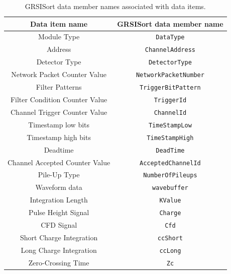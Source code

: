 \documentclass[letterpaper,12pt,notitlepage]{report}
\begin{document}
\newpage
\begin{table}
\begin{center}
\begin{tabular}{cc}
\hline
\hline
Data item name & GRSISort data member name\\
\hline
Module Type & \texttt{DataType} \\
Address & \texttt{ChannelAddress} \\
Detector Type & \texttt{DetectorType} \\
Network Packet Counter Value & \texttt{NetworkPacketNumber} \\
Filter Patterns & \texttt{TriggerBitPattern}\\
Filter Condition Counter Value & \texttt{TriggerId}\\
Channel Trigger Counter Value & \texttt{ChannelId} \\
Timestamp low bits & \texttt{TimeStampLow} \\
Timestamp high bits & \texttt{TimeStampHigh} \\
Deadtime & \texttt{DeadTime} \\
Channel Accepted Counter Value & \texttt{AcceptedChannelId} \\
Pile-Up Type & \texttt{NumberOfPileups}\\
Waveform data & \texttt{wavebuffer} \\
Integration Length & \texttt{KValue} \\
Pulse Height Signal & \texttt{Charge} \\
CFD Signal & \texttt{Cfd} \\
Short Charge Integration & \texttt{ccShort} \\
Long Charge Integration & \texttt{ccLong} \\
Zero-Crossing Time & \texttt{Zc} \\
\hline
\hline
\end{tabular}
\caption{GRSISort data member names associated with data items.}
\label{table.grsisort}
\end{center}
\end{table}
\end{document}
